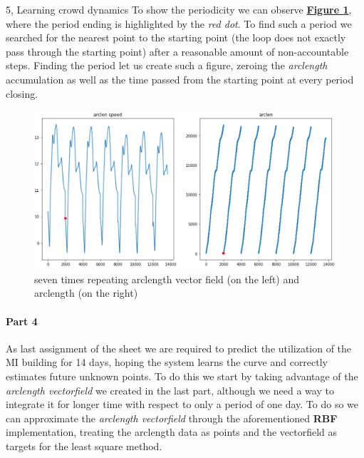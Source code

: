 \documentclass[10pt,a4paper]{article}
\begin{document}
\begin{task}{5, Learning crowd dynamics}
To show the periodicity we can observe \textbf{\hyperref[fig:task5-arclen]{Figure \ref{fig:task5-arclen}}}, where the period ending is highlighted by the \textit{red dot}. To find such a period we searched for the nearest point to the starting point (the loop does not exactly pass through the starting point) after a reasonable amount of non-accountable steps. Finding the period let us create such a figure, zeroing the \textit{arclength} accumulation as well as the time passed from the starting point at every period closing.

\begin{figure}[H]
    \centering
    \includegraphics[scale=0.6]{images/task5-arclen.png}
    \caption{seven times repeating arclength vector field (on the left) and arclength (on the right)}
    \label{fig:task5-arclen}
\end{figure}


\paragraph{Part 4}
As last assignment of the sheet we are required to predict the utilization of the MI building for 14 days, hoping the system learns the curve and correctly estimates future unknown points. To do this we start by taking advantage of the \textit{arclength vectorfield} we created in the last part, although we need a way to integrate it for longer time with respect to only a period of one day. To do so we can approximate the \textit{arclength vectorfield} through the aforementioned \textbf{RBF} implementation, treating the arclength data as points and the vectorfield as targets for the least square method. 


\end{task}
\end{document}
